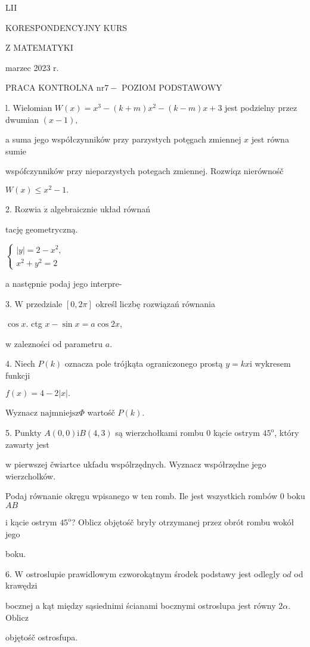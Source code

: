 \documentclass[a4paper,12pt]{article}
\begin{document}
LII

KORESPONDENCYJNY KURS

Z MATEMATYKI

marzec 2023 r.

PRACA KONTROLNA $\mathrm{n}\mathrm{r} 7-$ POZIOM PODSTAWOWY

l. Wielomian $W(x) =x^{3}-(k+m)x^{2}-(k-m)x+3$ jest podzielny przez dwumian $(x-1),$

a suma jego współczynników przy parzystych potęgach zmiennej $x$ jest równa sumie

wspófczynników przy nieparzystych potegach zmiennej. Rozwiqz nierównośč

$W(x)\leq x^{2}-1.$

2. Rozwia $\dot{\mathrm{z}}$ algebraicznie układ równań

tację geometryczną.

$\left\{\begin{array}{l}
|y|=2-x^{2},\\
x^{2}+y^{2}=2
\end{array}\right.$

a następnie podaj jego interpre-

3. $\mathrm{W}$ przedziale $[0,2\pi]$ określ liczbę rozwiązań równania

$\cos x$. ctg $x-\sin x=a\cos 2x,$

$\mathrm{w}$ zalezności od parametru $a.$

4. Niech $P(k)$ oznacza pole trójkąta ograniczonego prostą $y=kx\mathrm{i}$ wykresem funkcji

$f(x)=4-2|x|.$

Wyznacz $\mathrm{n}\mathrm{a}\mathrm{j}\mathrm{m}\mathrm{n}\mathrm{i}\mathrm{e}\mathrm{j}\mathrm{s}\mathrm{z}\Phi$ wartośč $P(k).$

5. Punkty $A(0,0)\mathrm{i}B(4,3)$ są wierzchołkami rombu $0$ kącie ostrym $45^{\mathrm{o}}$, który zawarty jest

$\mathrm{w}$ pierwszej čwiartce ukfadu wspólrzędnych. Wyznacz współrzędne jego wierzcholków.

Podaj równanie okręgu wpisanego $\mathrm{w}$ ten romb. Ile jest wszystkich rombów $0$ boku $AB$

$\mathrm{i}$ kącie ostrym $45^{\mathrm{o}}$? Oblicz objętośč bryły otrzymanej przez obrót rombu wokół jego

boku.

6. $\mathrm{W}$ ostroslupie prawidlowym czworokątnym środek podstawy jest odlegly $\mathrm{o}d$ od krawędzi

bocznej a kąt między sąsiednimi ścianami bocznymi ostroslupa jest równy $ 2\alpha$. Oblicz

objętośč ostrosfupa.
\end{document}
